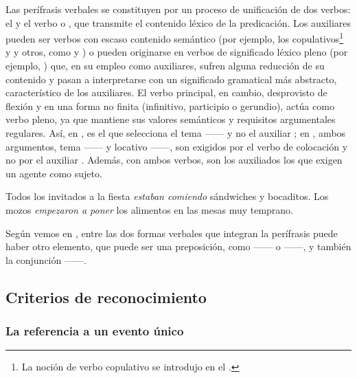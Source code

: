 Las perífrasis verbales se constituyen por un proceso de unificación de dos
verbos: el  y el verbo  o
, que transmite el contenido léxico de la predicación. Los
auxiliares pueden ser verbos con escaso contenido semántico (por ejemplo, los
copulativos\footnote{La noción de verbo copulativo se introdujo en el
.}  y  y otros, como  y
) o pueden originarse en verbos de significado léxico pleno (por
ejemplo, ) que, en su empleo como auxiliares, sufren
alguna reducción de su contenido y pasan a interpretarse con un significado
gramatical más abstracto, característico de los auxiliares. El verbo principal,
en cambio, desprovisto de flexión y en una forma no finita (infinitivo,
participio o gerundio), actúa como verbo pleno, ya que mantiene sus valores
semánticos y requisitos argumentales regulares. Así, en , es
 el que selecciona el tema ------ y
no el auxiliar ; en , ambos argumentos, tema
------ y locativo ------, son exigidos
por el verbo de colocación  y no por el auxiliar .
Además, con ambos verbos, son los auxiliados los que exigen un agente como
sujeto.

\begin{exe}
  \ex\label{ex:11-fiesta} Todos los invitados a la fiesta \textit{estaban
      comiendo} sándwiches y bocaditos.
  \ex\label{ex:11-mozos} Los mozos \textit{empezaron a poner} los alimentos en
      las mesas muy temprano.
\end{exe}

Según vemos en , entre las dos formas verbales que integran la
perífrasis puede haber otro elemento, que puede ser una preposición, como
 ------ o  ------, y también la conjunción  ------.

\subsection{Criterios de reconocimiento}\label{sec:11-criterios}

\subsubsection{La referencia a un evento único}\label{sec:11-evento}


